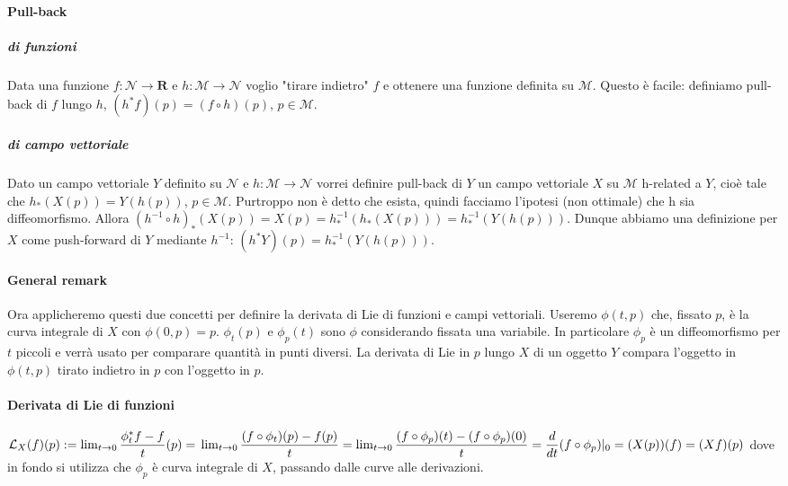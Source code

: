 \documentclass[]{article}
\begin{document}
\paragraph{Pull-back}
\subparagraph{di funzioni}
Data una funzione $f: \mathcal{N} \rightarrow \mathbf{R}$ e $h: \mathcal{M} \rightarrow \mathcal{N}$ voglio "tirare indietro" $f$ e ottenere una funzione definita su $\mathcal{M}$. Questo è facile: definiamo pull-back di $f$ lungo $h$, $(h^*f)(p) = (f \circ h)(p)$, $p \in \mathcal{M}$.
\subparagraph{di campo vettoriale}
Dato un campo vettoriale $Y$ definito su $\mathcal{N}$ e $h: \mathcal{M} \rightarrow \mathcal{N}$ vorrei definire pull-back di $Y$ un campo vettoriale $X$ su $\mathcal{M}$ h-related a $Y$, cioè tale che $h_*(X(p)) = Y(h(p))$, $p \in \mathcal{M}$. Purtroppo non è detto che esista, quindi facciamo l'ipotesi (non ottimale) che h sia diffeomorfismo. Allora
$(h^{-1} \circ h)_*(X(p)) = X(p) = h^{-1}_* (h_*(X(p))) = h^{-1}_*(Y(h(p)))$. Dunque abbiamo una definizione per $X$ come push-forward di $Y$ mediante $h^{-1}$: $(h^*Y)(p) = h^{-1}_*(Y(h(p)))$.

\paragraph{General remark}
Ora applicheremo questi due concetti per definire la derivata di Lie di funzioni e campi vettoriali. Useremo $\phi(t, p)$ che, fissato $p$, è la curva integrale di $X$ con $\phi(0,p) = p$. $\phi_t(p)$ e $\phi_p(t)$ sono $\phi$ considerando fissata una variabile. In particolare $\phi_p$ è un diffeomorfismo per $t$ piccoli e verrà usato per comparare quantità in punti diversi.
La derivata di Lie in $p$ lungo $X$ di un oggetto $Y$ compara l'oggetto in $\phi(t, p)$ tirato indietro in $p$ con l'oggetto in $p$.

\paragraph{Derivata di Lie di funzioni}
$\mathcal{L}_X (f) (p) := \lim_{t\rightarrow 0} \dfrac{\phi_t^*f - f}{t} (p) =\\ \lim_{t\rightarrow 0} \dfrac{(f \circ \phi_t)(p) - f(p)}{t} = \lim_{t\rightarrow 0} \dfrac{(f \circ \phi_p)(t) - (f \circ \phi_p)(0)}{t} = \dfrac{d}{dt} (f \circ \phi_p)|_0 = \\ (X(p)) (f) = (Xf)(p)$
dove in fondo si utilizza che $\phi_p$ è curva integrale di $X$, passando dalle curve alle derivazioni.
\end{document}
